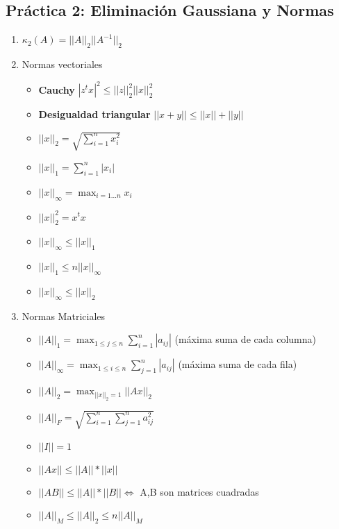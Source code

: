 \subsection*{Práctica 2: Eliminación Gaussiana y Normas}
\begin{enumerate}
    \item $\kappa_2(A) = ||A||_2 ||A^{-1}||_2$
    \item Normas vectoriales
    \begin{itemize}
        \item \textbf{Cauchy} $|z^tx|^2 \leq ||z||_2^2 ||x||_2^2$
         \item \textbf{Desigualdad triangular} $||x+y|| \leq ||x||+||y||$
        \item $||x||_2 = \sqrt{\sum_{i=1}^{n} x_i^2}$
        \item $||x||_1 = \sum_{i=1}^{n} |x_i|$
        \item $||x||_{\infty}  = \max_{i=1 \dots n} x_i$
        \item $||x||_2^2 = x^tx$
        \item $||x||_{\infty} \leq ||x||_1$
        \item $||x||_1 \leq n ||x||_{\infty}$
        \item $||x||_{\infty} \leq ||x||_2$
    \end{itemize}
    \item Normas Matriciales
    \begin{itemize}
         \item $||A||_1 = \max_{1\leq j\leq n} \sum_{i=1}^{n} |a_{ij}|$ (máxima suma de cada columna)
          \item $||A||_{\infty} = \max_{1\leq i\leq n} \sum_{j=1}^{n} |a_{ij}|$ (máxima suma de cada fila)
         \item $||A||_2 = \max_{||x||_2=1} ||Ax||_2$
         \item $||A||_F = \sqrt{\sum_{i=1}^{n} \sum_{j=1}^{n} a_{ij}^2}$
        \item $||I|| = 1$
        \item $||Ax|| \leq ||A||*||x||$
        \item $||AB|| \leq ||A||*||B|| \iff$ A,B son matrices cuadradas
        \item $||A||_M \leq ||A||_2 \leq n ||A||_M$
    \end{itemize}
\end{enumerate}

